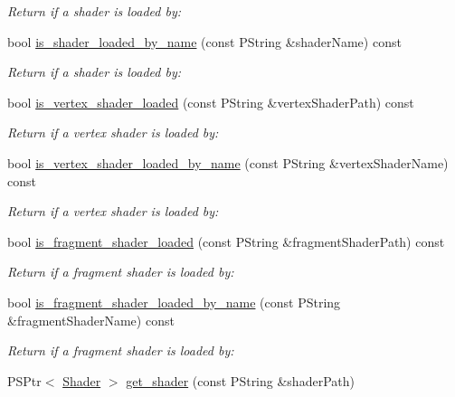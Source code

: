 \begin{DoxyCompactItemize}
\begin{DoxyCompactList}\small\item\em Return if a shader is loaded by\+: \end{DoxyCompactList}\item 
bool \mbox{\hyperlink{classprz_1_1_shader___loader_ad01ebe77c757cac0163e0c46dec05999}{is\+\_\+shader\+\_\+loaded\+\_\+by\+\_\+name}} (const P\+String \&shader\+Name) const
\begin{DoxyCompactList}\small\item\em Return if a shader is loaded by\+: \end{DoxyCompactList}\item 
bool \mbox{\hyperlink{classprz_1_1_shader___loader_a927613e561c82e198f6a1764be622645}{is\+\_\+vertex\+\_\+shader\+\_\+loaded}} (const P\+String \&vertex\+Shader\+Path) const
\begin{DoxyCompactList}\small\item\em Return if a vertex shader is loaded by\+: \end{DoxyCompactList}\item 
bool \mbox{\hyperlink{classprz_1_1_shader___loader_ade063fcef4098ddda048cc4281efd1af}{is\+\_\+vertex\+\_\+shader\+\_\+loaded\+\_\+by\+\_\+name}} (const P\+String \&vertex\+Shader\+Name) const
\begin{DoxyCompactList}\small\item\em Return if a vertex shader is loaded by\+: \end{DoxyCompactList}\item 
bool \mbox{\hyperlink{classprz_1_1_shader___loader_ac70cb86a50808ced5b668a46f5d010fc}{is\+\_\+fragment\+\_\+shader\+\_\+loaded}} (const P\+String \&fragment\+Shader\+Path) const
\begin{DoxyCompactList}\small\item\em Return if a fragment shader is loaded by\+: \end{DoxyCompactList}\item 
bool \mbox{\hyperlink{classprz_1_1_shader___loader_a2eea0d7674cfde8826965665c19c44c7}{is\+\_\+fragment\+\_\+shader\+\_\+loaded\+\_\+by\+\_\+name}} (const P\+String \&fragment\+Shader\+Name) const
\begin{DoxyCompactList}\small\item\em Return if a fragment shader is loaded by\+: \end{DoxyCompactList}\item 
P\+S\+Ptr$<$ \mbox{\hyperlink{classprz_1_1_shader}{Shader}} $>$ \mbox{\hyperlink{classprz_1_1_shader___loader_a4e23aa9732cbb8ee6f77fe44c6bf58fe}{get\+\_\+shader}} (const P\+String \&shader\+Path)

\end{DoxyCompactItemize}
